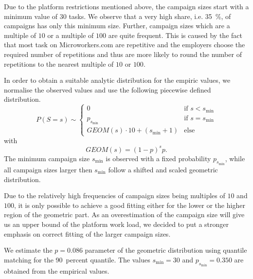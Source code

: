 Due to the platform restrictions mentioned above, the campaign sizes start with a minimum value of \(30\) tasks.
We observe that a very high share, i.e. \SI{35}{\percent}, of campaigns has only this minimum size.
Further, campaign sizes which are a multiple of \(10\) or a multiple of \(100\) are quite frequent.
This is caused by the fact that most task on Microworkers.com are repetitive and the employers choose the required number of repetitions and thus are more likely to round the number of repetitions to the nearest multiple of \(10\) or \(100\).

In order to obtain a suitable analytic distribution for the empiric values, we normalise the observed values and use the following piecewise defined distribution.
\begin{equation*}
P(S=s) \sim
\begin{cases}
  0 & \text{if } s < s_{\min}\\
  p_{s_{\min}} & \text{if } s=s_{\min} \\
  GEOM(s) \cdot 10 + (s_{\min}+1) & \text{else}
\end{cases}
\end{equation*}
with
\begin{equation*}
GEOM(s) = {(1-p)}^s p.
\end{equation*}
The minimum campaign size \(s_{\min}\) is observed with a fixed probability \(p_{s_{\min}}\), while all campaign sizes larger then \(s_{\min}\) follow a shifted and scaled geometric distribution.

Due to the relatively high frequencies of campaign sizes being multiples of \(10\) and \(100\), it is only possible to achieve a good fitting either for the lower or the higher region of the geometric part.
As an overestimation of the campaign size will give us an upper bound of the platform work load, we decided to put a stronger emphasis on correct fitting of the larger campaign sizes.

We estimate the \(p=0.086\) parameter of the geometric distribution using quantile matching for the \SI{90}{percent} quantile.
The values \(s_{\min}=30\) and \(p_{s_{\min}}=0.350\) are obtained from the empirical values.

